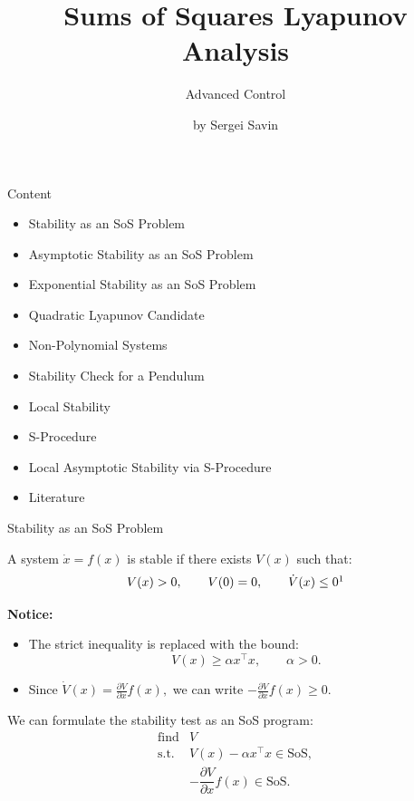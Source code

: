 \documentclass{beamer}
\title{Sums of Squares Lyapunov Analysis}
\subtitle{Advanced Control}
\author{by Sergei Savin}
\date{\mydate}
\begin{document}
\maketitle


\begin{frame}{Content}
	\begin{itemize}
		\item Stability as an SoS Problem
		\item Asymptotic Stability as an SoS Problem
		\item Exponential Stability as an SoS Problem
		\item Quadratic Lyapunov Candidate
		\item Non-Polynomial Systems
		\item Stability Check for a Pendulum
		\item Local Stability
		\item S-Procedure
		\item Local Asymptotic Stability via S-Procedure
		\item Literature
	\end{itemize}
\end{frame}


\begin{frame}{Stability as an SoS Problem}
	\begin{flushleft}
		A system $\dot{x}=f(x)$ is stable if there exists $V(x)$ such that:
		\[
		V(x)>0,\qquad V(0)=0,\qquad \dot V(x)\leq0\footnotemark
		\]
		
		\bigskip
		
		\textbf{Notice:}
		\begin{itemize}
			\item The strict inequality is replaced with the bound:
			\[
			V(x)\geq\alpha x^\top x,\qquad \alpha>0.
			\]
			
			\item Since $\dot V(x)
			=
			\frac{\partial V}{\partial x}f(x),$	we can write $-\frac{\partial V}{\partial x}f(x)\geq0$.
		\end{itemize}
		
		\bigskip
		
		We can formulate the stability test as an SoS program:
		\[
		\begin{array}{ll}
			\text{find} & V\\[0.2em]
			\text{s.t.} &
			V(x)-\alpha x^\top x\in\mathrm{SoS},\\
			&
			-\dfrac{\partial V}{\partial x}f(x)\in\mathrm{SoS}.
		\end{array}
		\]
	\end{flushleft}
	
\end{frame}
\end{document}
